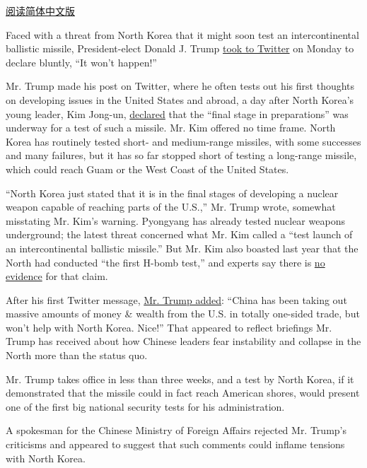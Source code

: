 \href{http://cn.nytimes3xbfgragh.onion/asia-pacific/20170104/trump-twitter-north-korea-missiles-china/}{阅读简体中文版}

Faced with a threat from North Korea that it might soon test an
intercontinental ballistic missile, President-elect Donald J. Trump
\href{https://twitter.com/realDonaldTrump/status/816057920223846400?lang=en}{took
to Twitter} on Monday to declare bluntly, ``It won't happen!''

Mr. Trump made his post on Twitter, where he often tests out his first
thoughts on developing issues in the United States and abroad, a day
after North Korea's young leader, Kim Jong-un,
\href{https://www.nytimes3xbfgragh.onion/2017/01/01/world/asia/north-korea-intercontinental-ballistic-missile-test-kim-jong-un.html}{declared}
that the ``final stage in preparations'' was underway for a test of such
a missile. Mr. Kim offered no time frame. North Korea has routinely
tested short- and medium-range missiles, with some successes and many
failures, but it has so far stopped short of testing a long-range
missile, which could reach Guam or the West Coast of the United States.

``North Korea just stated that it is in the final stages of developing a
nuclear weapon capable of reaching parts of the U.S.,'' Mr. Trump wrote,
somewhat misstating Mr. Kim's warning. Pyongyang has already tested
nuclear weapons underground; the latest threat concerned what Mr. Kim
called a ``test launch of an intercontinental ballistic missile.'' But
Mr. Kim also boasted last year that the North had conducted ``the first
H-bomb test,'' and experts say there is
\href{https://www.nytimes3xbfgragh.onion/2016/01/07/world/asia/north-korea-hydrogen-bomb-q-a.html}{no
evidence} for that claim.

After his first Twitter message,
\href{https://twitter.com/realDonaldTrump/status/816068355555815424}{Mr.
Trump added}: ``China has been taking out massive amounts of money \&
wealth from the U.S. in totally one-sided trade, but won't help with
North Korea. Nice!'' That appeared to reflect briefings Mr. Trump has
received about how Chinese leaders fear instability and collapse in the
North more than the status quo.

Mr. Trump takes office in less than three weeks, and a test by North
Korea, if it demonstrated that the missile could in fact reach American
shores, would present one of the first big national security tests for
his administration.

A spokesman for the Chinese Ministry of Foreign Affairs rejected Mr.
Trump's criticisms and appeared to suggest that such comments could
inflame tensions with North Korea.

